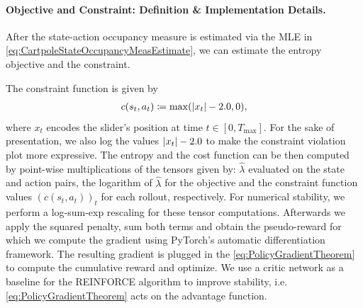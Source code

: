 \documentclass{article}
\theoremstyle{plain}
\theoremstyle{definition}
\theoremstyle{remark}
\DeclarePairedDelimiter{\abs}{\lvert}{\rvert}
\newcommand{\define}{\coloneqq}
\def\lambdaHat{{\widehat{\lambda}}}
\def\ss{{s}}
\def\aa{{a}}
\def\ss{{s}}
\def\Tmax{{T_{\max}}}
\begin{document}
\paragraph{Objective and Constraint: Definition \& Implementation Details.}
After the state-action occupancy measure is estimated via the MLE in
\eqref{eq:CartpoleStateOccupancyMeasEstimate}, we can estimate the entropy
objective and the constraint.

The constraint function is given by
\begin{align*}
 c(\ss_t, \aa_t) \define \max(\abs{x_t} - 2.0,0),
\end{align*}
where $x_t$ encodes the slider's position at time $t \in [0, \Tmax]$. For the sake of
presentation, we also log the values $\abs{x_t} - 2.0$ to make the constraint
violation plot more expressive.
The entropy and the cost function can be then computed by point-wise multiplications
of the tensors given by: $\lambdaHat$ evaluated on the state and action pairs,
the logarithm of $\lambdaHat$ for the objective and
the constraint function values $(c(\ss_t, \aa_t))_t$ for each rollout,
respectively. For numerical stability, we perform a log-sum-exp rescaling
for these tensor computations. Afterwards we apply the squared penalty,
sum both terms and obtain the pseudo-reward for which we compute the gradient
using PyTorch's \cite{paszkePyTorchImperativeStyle2019a} automatic differentiation
framework. The resulting gradient is plugged in the \eqref{eq:PolicyGradientTheorem}
to compute the cumulative reward and optimize. We use a critic network as a baseline
for the REINFORCE algorithm to improve stability, i.e. \eqref{eq:PolicyGradientTheorem}
acts on the advantage function.
\end{document}
